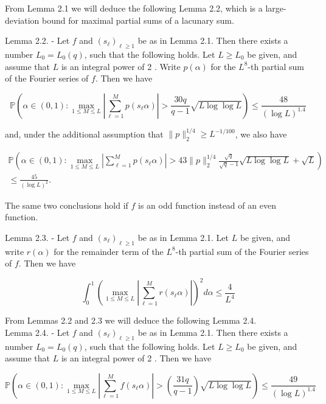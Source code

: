 \documentclass[10pt]{article}
\newcommand{\1}{\mathbf{1}}
\begin{document}
From Lemma 2.1 we will deduce the following Lemma 2.2, which is a large-deviation bound for maximal partial sums of a lacunary sum.

Lemma 2.2. - Let $f$ and $\left(s_{\ell}\right)_{\ell \geqslant 1}$ be as in Lemma 2.1. Then there exists a number $L_{0}=L_{0}(q)$, such that the following holds. Let $L \geqslant L_{0}$ be given, and assume that $L$ is an integral power of 2 . Write $p(\alpha)$ for the $L^{8}$-th partial sum of the Fourier series of $f$. Then we have

$$
\mathbb{P}\left(\alpha \in(0,1): \max _{1 \leqslant M \leqslant L}\left|\sum_{\ell=1}^{M} p\left(s_{\ell} \alpha\right)\right|>\frac{30q}{q-1} \sqrt{L \log \log L}\right) \leqslant \frac{48}{(\log L)^{1.4}}
$$

and, under the additional assumption that $\|p\|_{2}^{1 / 4} \geqslant L^{-1 / 100}$, we also have

$$
\begin{array}{r}
\mathbb{P}\left(\alpha \in(0,1): \max _{1 \leqslant M \leqslant L}\left|\sum_{\ell=1}^{M} p\left(s_{\ell} \alpha\right)\right|>43\|p\|_{2}^{1 / 4} \frac{\sqrt{q}}{\sqrt{q}-1} \sqrt{L \log \log L}+\sqrt{L}\right) \\
\leqslant \frac{45}{(\log L)^{2}} .
\end{array}
$$

The same two conclusions hold if $f$ is an odd function instead of an even function.

Lemma 2.3. - Let $f$ and $\left(s_{\ell}\right)_{\ell \geqslant 1}$ be as in Lemma 2.1. Let $L$ be given, and write $r(\alpha)$ for the remainder term of the $L^{8}$-th partial sum of the Fourier series of $f$. Then we have

$$
\int_{0}^{1}\left(\max _{1 \leqslant M \leqslant L}\left|\sum_{\ell=1}^{M} r\left(s_{\ell} \alpha\right)\right|\right)^{2} d \alpha \leqslant \frac{4}{L^{4}}
$$

From Lemmas 2.2 and 2.3 we will deduce the following Lemma 2.4.\\
Lemma 2.4. - Let $f$ and $\left(s_{\ell}\right)_{\ell \geqslant 1}$ be as in Lemma 2.1. Then there exists a number $L_{0}=L_{0}(q)$, such that the following holds. Let $L \geqslant L_{0}$ be given, and assume that $L$ is an integral power of 2 . Then we have

$$
\mathbb{P}\left(\alpha \in(0,1): \max _{1 \leqslant M \leqslant L}\left|\sum_{\ell=1}^{M} f\left(s_{\ell} \alpha\right)\right|>\left(\frac{31q}{q-1}\right)\sqrt{L\log\log L}\right) \leqslant \frac{49}{(\log L)^{1.4}}
$$
\end{document}
